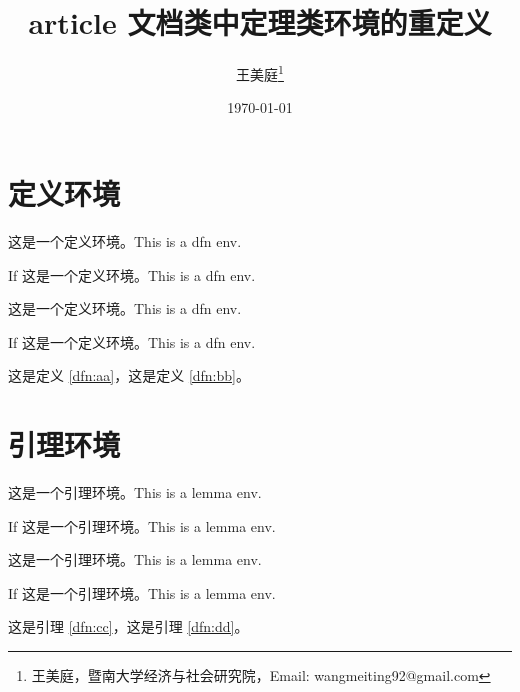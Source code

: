 \documentclass[UTF8,space=auto]{ctexart} %
\title{
	article 文档类中定理类环境的重定义
}
\author{王美庭\thanks{王美庭，暨南大学经济与社会研究院，Email: wangmeiting92@gmail.com}}
\date{\today}
\begin{document}
\maketitle

\section{定义环境}

\lipsum[1][1-3]

\begin{dfn}\label{dfn:aa}%
	这是一个定义环境。This is a dfn env.
\end{dfn}

\begin{dfn}
	If 这是一个定义环境。This is a dfn env.
\end{dfn}

\begin{dfn}[xx 名词]
	这是一个定义环境。This is a dfn env.
\end{dfn}

\begin{dfn}[xx 名词]\label{dfn:bb}%
	If 这是一个定义环境。This is a dfn env.
\end{dfn}

\lipsum[1][1-3]

这是定义 \ref{dfn:aa}，这是定义 \ref{dfn:bb}。


\section{引理环境}

\lipsum[1][1-3]

\begin{lemma}\label{dfn:cc}%
	这是一个引理环境。This is a lemma env.
\end{lemma}

\begin{lemma}
	If 这是一个引理环境。This is a lemma env.
\end{lemma}

\begin{lemma}[xx 引理]
	这是一个引理环境。This is a lemma env.
\end{lemma}

\begin{lemma}[xx 引理]\label{dfn:dd}%
	If 这是一个引理环境。This is a lemma env.
\end{lemma}

\lipsum[1][1-3]

这是引理 \ref{dfn:cc}，这是引理 \ref{dfn:dd}。
\end{document}
